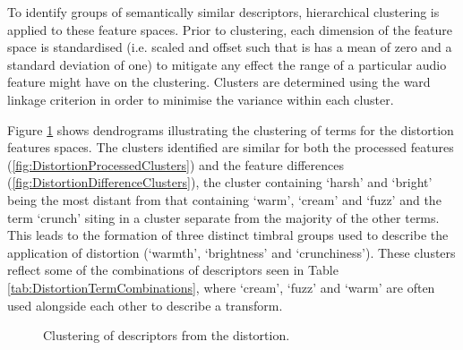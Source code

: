 		To identify groups of semantically similar descriptors, hierarchical clustering is applied to these feature
		spaces. Prior to clustering, each dimension of the feature space is standardised (i.e. scaled and offset
		such that is has a mean of zero and a standard deviation of one) to mitigate any effect the range of a
		particular audio feature might have on the clustering. Clusters are determined using the ward linkage
		criterion \citep{ward1963hierarchical} in order to minimise the variance within each cluster.

		Figure \ref{fig:DistortionClusters} shows dendrograms illustrating the clustering of terms for the
		distortion features spaces. The clusters identified are similar for both the processed features
		(\ref{fig:DistortionProcessedClusters}) and the feature differences
		(\ref{fig:DistortionDifferenceClusters}), the cluster containing `harsh' and `bright' being the most
		distant from that containing `warm', `cream' and `fuzz' and the term `crunch' siting in a cluster separate
		from the majority of the other terms. This leads to the formation of three distinct timbral groups used to
		describe the application of distortion (`warmth', `brightness' and `crunchiness'). These clusters reflect
		some of the combinations of descriptors seen in Table \ref{tab:DistortionTermCombinations}, where `cream',
		`fuzz' and `warm' are often used alongside each other to describe a transform.

		\begin{figure}[h!]
			\centering
			\qquad
			\caption{Clustering of descriptors from the distortion.}
			\label{fig:DistortionClusters}
		\end{figure}
		
